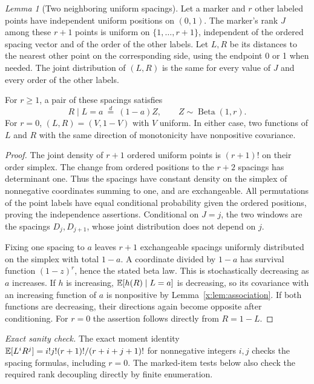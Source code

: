 \documentclass[11pt,a4paper]{article}
\theoremstyle{definition}\newtheorem{definition}[theorem]{Definition}
\theoremstyle{remark}\newtheorem{remark}[theorem]{Remark}
\newtheorem{xlemma}[xtheorem]{Lemma}
\theoremstyle{definition}\newtheorem{xexample}[xtheorem]{Example}\theoremstyle{plain}
\newcommand{\xcheck}[1]{\par\smallskip\textit{Exact sanity check.} #1\par}
\begin{document}
\begin{xlemma}[Two neighboring uniform spacings]\label{x:lem:spacings}
Let a marker and $r$ other labeled points have independent uniform positions on $(0,1)$. The marker's rank $J$ among these $r+1$ points is uniform on $\{1,\ldots,r+1\}$, independent of the ordered spacing vector and of the order of the other labels. Let $L,R$ be its distances to the nearest other point on the corresponding side, using the endpoint 0 or 1 when needed. The joint distribution of $(L,R)$ is the same for every value of $J$ and every order of the other labels.

For $r\ge1$, a pair of these spacings satisfies
\[
R\mid L=a\ \overset d=\ (1-a)Z,\qquad Z\sim\operatorname{Beta}(1,r).
\]
For $r=0$, $(L,R)=(V,1-V)$ with $V$ uniform. In either case, two functions of $L$ and $R$ with the same direction of monotonicity have nonpositive covariance.
\end{xlemma}
\begin{proof}
The joint density of $r+1$ ordered uniform points is $(r+1)!$ on their order simplex. The change from ordered positions to the $r+2$ spacings has determinant one. Thus the spacings have constant density on the simplex of nonnegative coordinates summing to one, and are exchangeable. All permutations of the point labels have equal conditional probability given the ordered positions, proving the independence assertions. Conditional on $J=j$, the two windows are the spacings $D_j,D_{j+1}$, whose joint distribution does not depend on $j$.

Fixing one spacing to $a$ leaves $r+1$ exchangeable spacings uniformly distributed on the simplex with total $1-a$. A coordinate divided by $1-a$ has survival function $(1-z)^r$, hence the stated beta law. This is stochastically decreasing as $a$ increases. If $h$ is increasing, $\mathbb E[h(R)\mid L=a]$ is decreasing, so its covariance with an increasing function of $a$ is nonpositive by Lemma~\ref{x:lem:association}. If both functions are decreasing, their directions again become opposite after conditioning. For $r=0$ the assertion follows directly from $R=1-L$.
\end{proof}
\xcheck{The exact moment identity $\mathbb E[L^iR^j]=i!j!(r+1)!/(r+i+j+1)!$ for nonnegative integers $i,j$ checks the spacing formulas, including $r=0$. The marked-item tests below also check the required rank decoupling directly by finite enumeration.}
\end{document}
